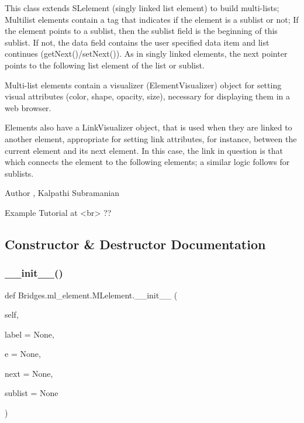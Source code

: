 This class extends S\+Lelement (singly linked list element) to build multi-\/lists; Multilist elements contain a tag that indicates if the element is a sublist or not; If the element points to a sublist, then the sublist field is the beginning of this sublist. If not, the data field contains the user specified data item and list continues (get\+Next()/set\+Next()). As in singly linked elements, the next pointer points to the following list element of the list or sublist.

Multi-\/list elements contain a visualizer (Element\+Visualizer) object for setting visual attributes (color, shape, opacity, size), necessary for displaying them in a web browser.

Elements also have a Link\+Visualizer object, that is used when they are linked to another element, appropriate for setting link attributes, for instance, between the current element and its next element. In this case, the link in question is that which connects the element to the following elements; a similar logic follows for sublists.

\begin{DoxyAuthor}{Author}
, Kalpathi Subramanian
\end{DoxyAuthor}
\begin{DoxyVerb}\sa Example Tutorial at <br> ??\end{DoxyVerb}
 

\subsection{Constructor \& Destructor Documentation}
\mbox{\label{class_bridges_1_1ml__element_1_1_m_lelement_a65f558578e90caac70a98e3e727cac38}} 
\subsubsection{\texorpdfstring{\+\_\+\+\_\+init\+\_\+\+\_\+()}{\_\_init\_\_()}}
{\footnotesize\ttfamily def Bridges.\+ml\+\_\+element.\+M\+Lelement.\+\_\+\+\_\+init\+\_\+\+\_\+ (\begin{DoxyParamCaption}\item[{}]{self,  }\item[{}]{label = {\ttfamily None},  }\item[{}]{e = {\ttfamily None},  }\item[{}]{next = {\ttfamily None},  }\item[{}]{sublist = {\ttfamily None} }\end{DoxyParamCaption})}



